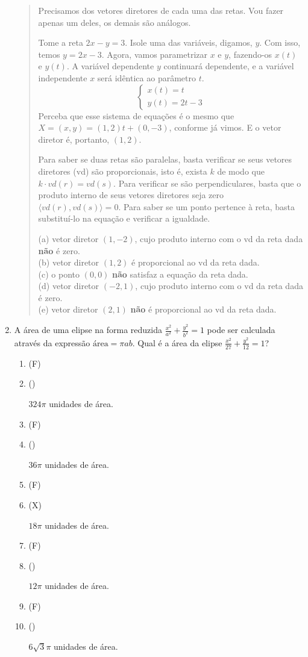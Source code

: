 \documentclass[12pt,a4paper]{article}
\newenvironment{ans}{\color{blue}\begin{quote}}{\end{quote}}
\newif \ifans
\newif \ifvf
\newcommand{\alt}{
	\ifvf
		\ifans
			\item({\sf\color{ForestGreen}V})
		\else 
			\item({\sf\color{Orange}F}) 
		\fi
	\else
		\ifans
			\item({\sf\color{Cyan}X})
		\else 
			\item({\sf\phantom{X}}) 
		\fi	
	\fi	
	\ansfalse
	\vffalse
}
\def\X{\anstrue}
\begin{document}
\begin{enumerate}
	\begin{ans}
	Precisamos dos vetores diretores de cada uma das retas. Vou fazer apenas um deles, os demais são análogos.
	
	Tome a reta $2x-y=3$. Isole uma das variáveis, digamos, $y$. Com isso, temos $y=2x-3$. Agora, vamos parametrizar $x$ e $y$, fazendo-os $x(t)$ e $y(t)$. A variável dependente $y$ continuará dependente, e a variável independente $x$ será idêntica ao parâmetro $t$.
	\[
	\begin{cases}
	x(t)=t\\
	y(t)=2t-3
	\end{cases}
	\]
	Perceba que esse sistema de equações é o mesmo que $X=(x,y)=(1,2)t+(0,-3)$, conforme já vimos. E o vetor diretor é, portanto, $(1,2)$.
	
	Para saber se duas retas são paralelas, basta verificar se seus vetores diretores (vd) são proporcionais, isto é, exista $k$ de modo que $k \cdot vd(r)=vd(s)$. Para verificar se são perpendiculares, basta que o produto interno de seus vetores diretores seja zero $\langle vd(r),vd(s) \rangle =0$. Para saber se um ponto pertence à reta, basta substituí-lo na equação e verificar a igualdade.
	
	(a) vetor diretor $(1,-2)$, cujo produto interno com o vd da reta dada \textbf{não} é zero.\\
	(b) vetor diretor $(1,2)$ é proporcional ao vd da reta dada.\\
	(c) o ponto $(0,0)$ \textbf{não} satisfaz a equação da reta dada.\\
	(d) vetor diretor $(-2,1)$, cujo produto interno com o vd da reta dada é zero.\\
	(e) vetor diretor $(2,1)$ \textbf{não} é proporcional ao vd da reta dada.
	\end{ans}





\item A área de uma elipse na forma reduzida $\tfrac{x^2}{a^2}+\tfrac{y^2}{b^2}=1$ pode ser calculada através da expressão $\text{área}=\pi ab$. Qual é a área da elipse $\tfrac{x^2}{27}+\tfrac{y^2}{12}=1$?
	
	\begin{enumerate}
	\alt $324\pi$ unidades de área.
	\alt $36\pi$ unidades de área.
	\X\alt $18\pi$ unidades de área.
	\alt $12\pi$ unidades de área.
	\alt $6\sqrt{3}\pi$ unidades de área.
	\end{enumerate}
	

\end{enumerate}
\end{document}
